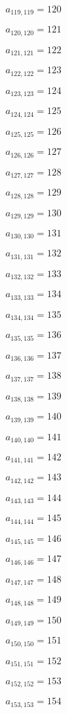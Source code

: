 \documentclass[a4paper,12pt]{article}
\begin{document}
$a _{ 119, 119 } = 120$

$a _{ 120, 120 } = 121$

$a _{ 121, 121 } = 122$

$a _{ 122, 122 } = 123$

$a _{ 123, 123 } = 124$

$a _{ 124, 124 } = 125$

$a _{ 125, 125 } = 126$

$a _{ 126, 126 } = 127$

$a _{ 127, 127 } = 128$

$a _{ 128, 128 } = 129$

$a _{ 129, 129 } = 130$

$a _{ 130, 130 } = 131$

$a _{ 131, 131 } = 132$

$a _{ 132, 132 } = 133$

$a _{ 133, 133 } = 134$

$a _{ 134, 134 } = 135$

$a _{ 135, 135 } = 136$

$a _{ 136, 136 } = 137$

$a _{ 137, 137 } = 138$

$a _{ 138, 138 } = 139$

$a _{ 139, 139 } = 140$

$a _{ 140, 140 } = 141$

$a _{ 141, 141 } = 142$

$a _{ 142, 142 } = 143$

$a _{ 143, 143 } = 144$

$a _{ 144, 144 } = 145$

$a _{ 145, 145 } = 146$

$a _{ 146, 146 } = 147$

$a _{ 147, 147 } = 148$

$a _{ 148, 148 } = 149$

$a _{ 149, 149 } = 150$

$a _{ 150, 150 } = 151$

$a _{ 151, 151 } = 152$

$a _{ 152, 152 } = 153$

$a _{ 153, 153 } = 154$
\end{document}

